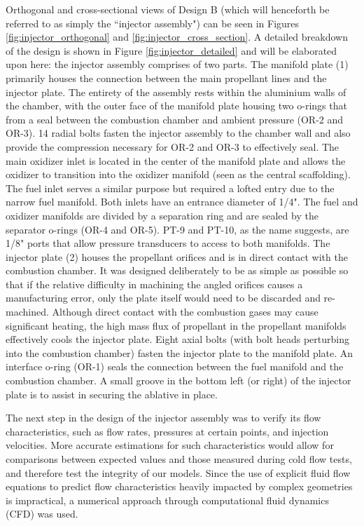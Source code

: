 \documentclass[9pt]{article} %
\numberwithin{equation}{section} %
\begin{document}
Orthogonal and cross-sectional views of Design B (which will henceforth be referred to as simply the ``injector assembly") can be seen in Figures \ref{fig:injector_orthogonal} and \ref{fig:injector_cross_section}. A detailed breakdown of the design is shown in Figure \ref{fig:injector_detailed} and will be elaborated upon here: the injector assembly comprises of two parts. The manifold plate (1) primarily houses the connection between the main propellant lines and the injector plate. The entirety of the assembly rests within the aluminium walls of the chamber, with the outer face of the manifold plate housing two o-rings that from a seal between the combustion chamber and ambient pressure (OR-2 and OR-3). 14 radial bolts fasten the injector assembly to the chamber wall and also provide the compression necessary for OR-2 and OR-3 to effectively seal. The main oxidizer inlet is located in the center of the manifold plate and allows the oxidizer to transition into the oxidizer manifold (seen as the central scaffolding). The fuel inlet serves a similar purpose but required a lofted entry due to the narrow fuel manifold. Both inlets have an entrance diameter of 1/4". The fuel and oxidizer manifolds are divided by a separation ring and are sealed by the separator o-rings (OR-4 and OR-5). PT-9 and PT-10, as the name suggests, are 1/8" ports that allow pressure transducers to access to both manifolds. The injector plate (2) houses the propellant orifices and is in direct contact with the combustion chamber. It was designed deliberately to be as simple as possible so that if the relative difficulty in machining the angled orifices causes a manufacturing error, only the plate itself would need to be discarded and re-machined. Although direct contact with the combustion gases may cause significant heating, the high mass flux of propellant in the propellant manifolds effectively cools the injector plate. Eight axial bolts (with bolt heads perturbing into the combustion chamber) fasten the injector plate to the manifold plate. An interface o-ring (OR-1) seals the connection between the fuel manifold and the combustion chamber. A small groove in the bottom left (or right) of the injector plate is to assist in securing the ablative in place.

The next step in the design of the injector assembly was to verify its flow characteristics, such as flow rates, pressures at certain points, and injection velocities. More accurate estimations for such characteristics would allow for comparisons between expected values and those measured during cold flow tests, and therefore test the integrity of our models. Since the use of explicit fluid flow equations to predict flow characteristics heavily impacted by complex geometries is impractical, a numerical approach through computational fluid dynamics (CFD) was used. 
\end{document}
